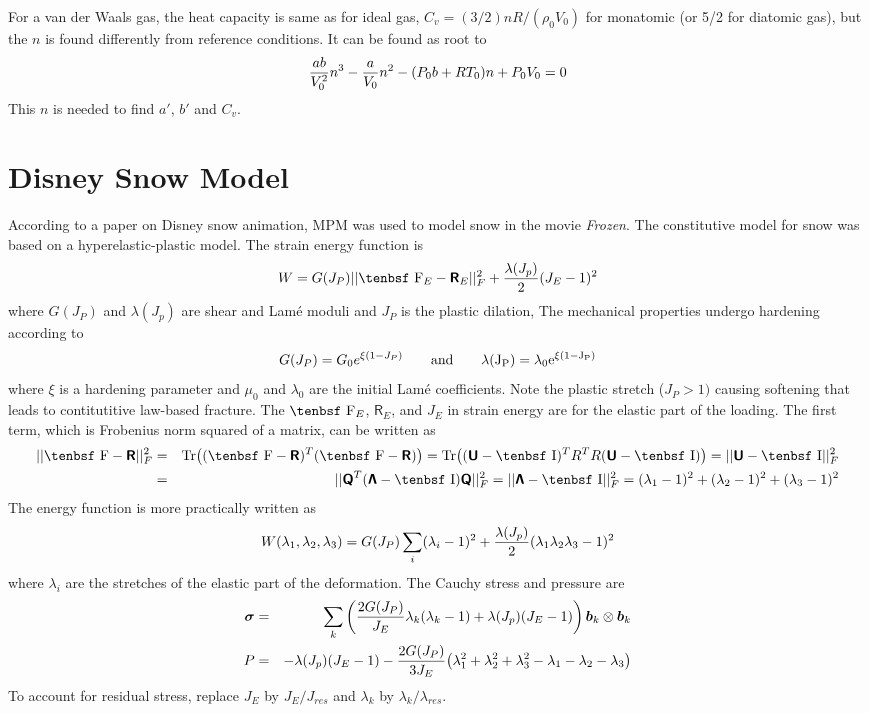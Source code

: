 \documentclass[11pt]{book}
\renewcommand{\vec}[1]{\boldsymbol{#1}}
\newcommand{\tens}[1]{\boldsymbol{\mathsf{#1}}}
\def\F{\hbox{\tenbsf F}}
\def\I{\hbox{\tenbsf I}}
\begin{document}
For a van der Waals gas, the heat capacity is same as for ideal gas, $C_v=(3/2)nR/(\rho_0 V_0)$ for monatomic (or 5/2 for diatomic gas), but the $n$ is found differently from reference conditions. It can be found as root to
\begin{equation}
     {ab\over V_0^2} n^3 - {a\over V_0} n^2 - (P_0b+RT_0)n + P_0V_0 = 0
\end{equation}
This $n$ is needed to find $a'$, $b'$ and $C_v$.

\section{Disney Snow Model\label{DSM}}

According to a paper on Disney snow animation, MPM was used to model snow in the movie {\em Frozen}. The constitutive model for snow was based on a hyperelastic-plastic model. The strain energy function is
\begin{equation}
   W=G(J_P) || \F_E - \tens R_E ||_F^2 + {\lambda(J_p)\over 2}(J_E-1)^2
\end{equation}
where $G(J_P)$ and $\lambda(J_p)$ are shear and Lam\'e moduli and $J_P$ is the plastic dilation, The mechanical properties undergo hardening according to
\begin{equation}
   G(J_P) = G_0 e^{\xi(1-J_P)} \qquad \rm and \qquad \lambda(J_P) = \lambda_0 e^{\xi(1-J_P)}
\end{equation}
where $\xi$ is a hardening parameter and $\mu_0$ and $\lambda_0$ are the initial Lam\'e coefficients. Note the plastic stretch ($J_P>1)$ causing softening that leads to contitutitive law-based fracture. The $\F_E$, $\tens R_E$, and $J_E$ in strain energy are for the elastic part of the loading. The first term, which is Frobenius norm squared of a matrix, can be written as
\begin{eqnarray}
   || \F - \tens R ||_F^2 & = & {\rm Tr}\bigl((\F - \tens R)^T(\F - \tens R)\bigr) = {\rm Tr}\bigl((\tens U - \I)^T R^TR(\tens U - \I)\bigr)
                      = || \tens U - \I ||_F^2 \\
         & = & || \tens Q^T(\tens\Lambda - \I)\tens Q ||_F^2 = || \tens\Lambda-\I ||_F^2 = (\lambda_1-1)^2 + (\lambda_2-1)^2 + (\lambda_3-1)^2 
\end{eqnarray}
The energy function is more practically written as
\begin{equation}
   W(\lambda_1,\lambda_2,\lambda_3)=G(J_P) \sum_i (\lambda_i-1)^2+ {\lambda(J_p)\over 2}(\lambda_1\lambda_2\lambda_3-1)^2
\end{equation}
where $\lambda_i$ are the stretches of the elastic part of the deformation. The Cauchy stress and pressure are
\begin{eqnarray}
   \tens\sigma & = & \sum_k  \left( {2G(J_P)\over J_E} \lambda_k(\lambda_k-1)+ \lambda(J_p)(J_E-1)\right) \vec b_k\otimes\vec b_k \\
   P & = & - \lambda(J_p)(J_E-1) - {2G(J_P)\over 3J_E} \bigl( \lambda_1^2+\lambda_2^2+\lambda_3^2-\lambda_1-\lambda_2-\lambda_3\bigr)
\end{eqnarray}
To account for residual stress, replace $J_E$ by $J_E/J_{res}$ and $\lambda_k$ by $\lambda_k/\lambda_{res}$.
\end{document}
